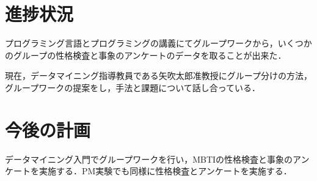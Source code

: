 \documentclass[uplatex,twocolumn,dvipdfmx]{jsarticle}
\begin{document}
\section{進捗状況}
プログラミング言語とプログラミングの講義にてグループワークから，いくつかのグループの性格検査と事象のアンケートのデータを取ることが出来た．

現在，データマイニング指導教員である矢吹太郎准教授にグループ分けの方法，グループワークの提案をし，手法と課題について話し合っている．

\section{今後の計画}
データマイニング入門でグループワークを行い，MBTIの性格検査と事象のアンケートを実施する．PM実験でも同様に性格検査とアンケートを実施する．


\nocite{110003745117}\nocite{ylab2015s}

\end{document}
